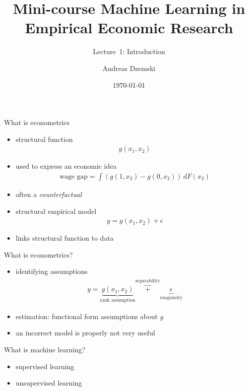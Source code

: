 \documentclass[xcolor=dvipsnames]{beamer}
\author[Dzemski]{Andreas Dzemski\inst{1}}
\institute{\inst{1} University of Gothenburg}
\title{Mini-course Machine Learning in Empirical Economic Research}
\date{\today}
\subtitle{Lecture~1: Introduction}
\begin{document}
\maketitle

\begin{frame}{What is econometrics}
\pause
\begin{itemize}
  \item structural function
  \begin{align*}
    g(x_1, x_2)
  \end{align*}
  \item used to express an economic idea
  \begin{align*}
    \text{wage gap} = \int \left(g(1, x_2) - g(0, x_2)\right) \, dF(x_2)
  \end{align*}
  \item often a \emph{counterfactual}
  \item structural empirical model
  \begin{align*}
    y = g(x_1, x_2) + \epsilon
  \end{align*}
  \item links structural function to data
\end{itemize}
\end{frame}

\begin{frame}{What is econometrics?}
  \begin{itemize}
    \item identifying assumptions
      \begin{align*}
        y = \underbrace{g(x_1, x_2)}_{\text{rank assumption}} \overbrace{+}^{\text{separability}} \underbrace{\epsilon}_{\text{exogeneity}}
      \end{align*}
    \item estimation: functional form assumptions about $g$
    \item an incorrect model is properly not very useful
  \end{itemize}
\end{frame}


\begin{frame}{What is machine learning?}
\pause
\begin{itemize}
  \item supervised learning
  \item unsupervised learning
\end{itemize}
\end{frame}
\end{document}
